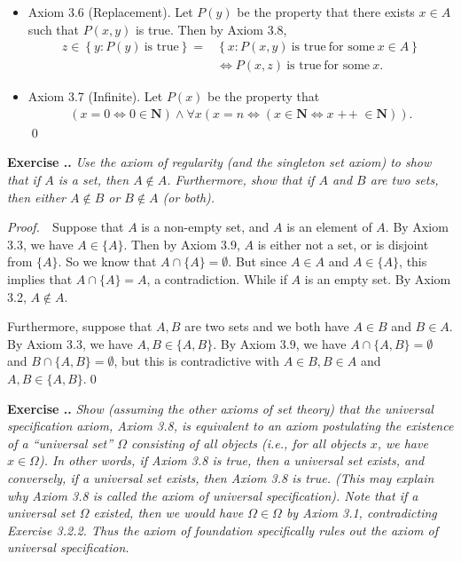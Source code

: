 \documentclass{book}
\DeclareMathOperator{\tadd}{+\!+}%
\newcommand{\pff}{\vspace{.25em}\noindent\emph{Proof.}~~}
\newcounter{Exercise}[section]
\renewcommand{\theExercise}{\thesection.\arabic{Exercise}.}
\newcommand{\new}{\vspace{1.5em}\noindent\textbf{{Exercise \stepcounter{Exercise}\textbf{\theExercise}}} }
\begin{document}
\begin{itemize}
    \item Axiom 3.6 (Replacement). Let $P(y)$ be the property that there exists $x\in A$ such that $P(x,y)$ is true. Then by Axiom 3.8,
    \begin{align*}
        z\in\left\{y:P(y)\ \textrm{is true}\right\}=&\left\{x:P(x,y)\ \textrm{is true}\ \textrm{for some}\ x\in A\right\}\\
        &\iff P(x,z)\ \textrm{is true}\ \textrm{for some}\ x.
    \end{align*}

    \item Axiom 3.7 (Infinite). Let $P(x)$ be the property that
        \begin{align*}
            (x=0\iff 0\in\mathbf{N})\land\forall x(x=n\iff(x\in\mathbf{N}\iff x\tadd\in\mathbf{N})).
        \end{align*}\qed
\end{itemize}

\new\emph{Use the axiom of regularity (and the singleton set axiom) to show that if $A$ is a set, then $A\notin A$. Furthermore, show that if $A$ and $B$ are two sets, then either $A\notin B$ or $B\notin A$ (or both).}

\pff Suppose that $A$ is a non-empty set, and $A$ is an element of $A$. By Axiom 3.3, we have $A\in\{A\}$. Then by Axiom 3.9, $A$ is either not a set, or is disjoint from $\{A\}$. So we know that $A\cap\{A\}=\emptyset$. But since $A\in A$ and $A\in\{A\}$, this implies that $A\cap\{A\}=A$, a contradiction. While if $A$ is an empty set. By Axiom 3.2, $A\notin A$.

Furthermore, suppose that $A,B$ are two sets and we both have $A\in B$ and $B\in A$. By Axiom 3.3, we have $A,B\in\{A,B\}$. By Axiom 3.9, we have $A\cap\{A,B\}=\emptyset$ and $B\cap\{A,B\}=\emptyset$, but this is contradictive with $A\in B,B\in A$ and $A,B\in\{A,B\}$.\qed

\new\emph{Show (assuming the other axioms of set theory) that the universal specification axiom, Axiom 3.8, is equivalent to an axiom postulating the existence of a ``universal set'' $\Omega$ consisting of all objects (i.e., for all objects $x$, we have $x\in\Omega$). In other words, if Axiom 3.8 is true, then a universal set exists, and conversely, if a universal set exists, then Axiom 3.8 is true. (This may explain why Axiom 3.8 is called the axiom of universal specification). Note that if a universal set $\Omega$ existed, then we would have $\Omega\in\Omega$ by Axiom 3.1, contradicting Exercise 3.2.2. Thus the axiom of foundation specifically rules out the axiom of universal specification.}
\end{document}
